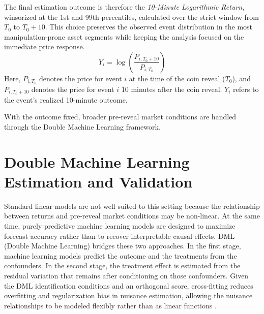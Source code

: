 The final estimation outcome is therefore the \textit{10-Minute Logarithmic Return}, winsorized at the 1st and 99th percentiles, calculated over the strict window from $T_0$ to $T_0+10$. This choice preserves the observed event distribution in the most manipulation-prone asset segments while keeping the analysis focused on the immediate price response.
\begin{equation}
Y_{i} = \log\left(\frac{P_{i,T_0 + 10}}{P_{i,T_0}}\right)
\label{eq:log-return}
\end{equation}
Here, $P_{i,T_0}$ denotes the price for event $i$ at the time of the coin reveal (${T}_0$), and $P_{i,T_0 + 10}$ denotes the price for event $i$ 10 minutes after the coin reveal. $Y_i$ refers to the event's realized 10-minute outcome.

With the outcome fixed, broader pre-reveal market conditions are handled through the Double Machine Learning framework.

\section{Double Machine Learning Estimation and Validation}
\label{sec:dml}
\label{sec:model-validation}
\label{sec:ate-estimation}

Standard linear models are not well suited to this setting because the relationship between returns and pre-reveal market conditions may be non-linear. At the same time, purely predictive machine learning models are designed to maximize forecast accuracy rather than to recover interpretable causal effects. DML (Double Machine Learning) \cite{chernozhukov2018double} bridges these two approaches. In the first stage, machine learning models predict the outcome and the treatments from the confounders. In the second stage, the treatment effect is estimated from the residual variation that remains after conditioning on those confounders. Given the DML identification conditions and an orthogonal score, cross-fitting reduces overfitting and regularization bias in nuisance estimation, allowing the nuisance relationships to be modeled flexibly rather than as linear functions \cite{chernozhukov2018double}.

